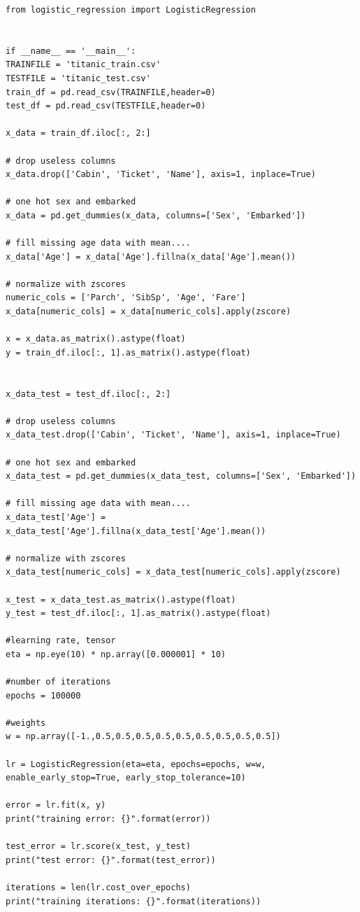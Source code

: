 \documentclass[12pt]{article}
\begin{document}
\begin{flushleft}
\begin{lstlisting}
from logistic_regression import LogisticRegression


if __name__ == '__main__':
TRAINFILE = 'titanic_train.csv'
TESTFILE = 'titanic_test.csv'
train_df = pd.read_csv(TRAINFILE,header=0)
test_df = pd.read_csv(TESTFILE,header=0)

x_data = train_df.iloc[:, 2:]

# drop useless columns
x_data.drop(['Cabin', 'Ticket', 'Name'], axis=1, inplace=True)

# one hot sex and embarked
x_data = pd.get_dummies(x_data, columns=['Sex', 'Embarked'])

# fill missing age data with mean....
x_data['Age'] = x_data['Age'].fillna(x_data['Age'].mean())

# normalize with zscores
numeric_cols = ['Parch', 'SibSp', 'Age', 'Fare']
x_data[numeric_cols] = x_data[numeric_cols].apply(zscore)

x = x_data.as_matrix().astype(float)
y = train_df.iloc[:, 1].as_matrix().astype(float)


x_data_test = test_df.iloc[:, 2:]

# drop useless columns
x_data_test.drop(['Cabin', 'Ticket', 'Name'], axis=1, inplace=True)

# one hot sex and embarked
x_data_test = pd.get_dummies(x_data_test, columns=['Sex', 'Embarked'])

# fill missing age data with mean....
x_data_test['Age'] = x_data_test['Age'].fillna(x_data_test['Age'].mean())

# normalize with zscores
x_data_test[numeric_cols] = x_data_test[numeric_cols].apply(zscore)

x_test = x_data_test.as_matrix().astype(float)
y_test = test_df.iloc[:, 1].as_matrix().astype(float)

#learning rate, tensor
eta = np.eye(10) * np.array([0.000001] * 10)

#number of iterations
epochs = 100000

#weights
w = np.array([-1.,0.5,0.5,0.5,0.5,0.5,0.5,0.5,0.5,0.5])

lr = LogisticRegression(eta=eta, epochs=epochs, w=w, enable_early_stop=True, early_stop_tolerance=10)

error = lr.fit(x, y)
print("training error: {}".format(error))

test_error = lr.score(x_test, y_test)
print("test error: {}".format(test_error))

iterations = len(lr.cost_over_epochs)
print("training iterations: {}".format(iterations))


\end{lstlisting}
\end{flushleft}
\end{document}
